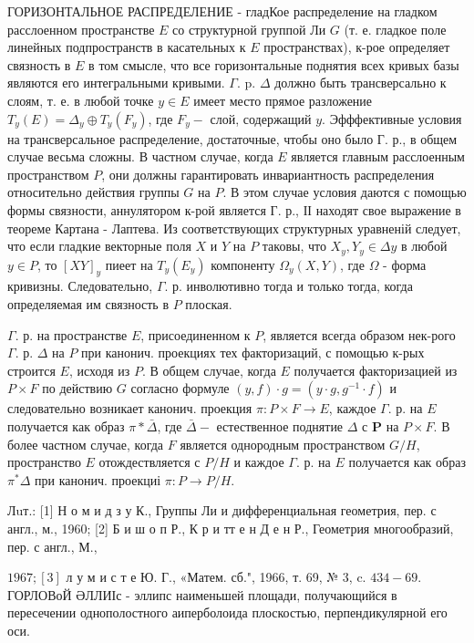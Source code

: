 \documentclass[10pt]{article}
\begin{document}
ГОРИЗОНТАЛЬНОЕ РАСПРЕДЕЛЕНИЕ - гладКое распределение на гладком расслоенном пространстве $E$ со структурной группой Ли $G$ (т. е. гладкое поле линейных подпространств в касательных к $E$ пространствах), к-рое определяет связность в $E$ в том смысле, что все горизонтальные поднятия всех кривых базы являются его интегральными кривыми. $\Gamma$. p. $\Delta$ должно быть трансверсально к слоям, т. е. в любой точке $y \in E$ имеет место прямое разложение $T_{y}(E)=\Delta_{y} \oplus T_{y}\left(F_{y}\right)$, где $F_{y}-$ слой, содержащий $y$. Эфффективные условия на трансверсальное распределение, достаточные, чтобы оно было Г. р., в общем случае весьма сложны. В частном случае, когда $E$ является главным расслоенным пространством $P$, они должны гарантировать инвариантность распределения относительно действия группы $G$ на $P$. В этом случае условия даются с помощью формы связности, аннулятором к-рой является $Г$. р., ІІ находят свое выражение в теореме Картана - Лаптева. Из соответствующих структурных уравненій следует, что если гладкие векторные поля $X$ и $Y$ на $P$ таковы, что $X_{y}, Y_{y} \in \Delta y$ в любой $y \in P$, то $[X Y]_{y}$ пиеет на $T_{y}\left(E_{y}\right)$ компоненту $\Omega_{y}(X, Y)$, где $\Omega$ - форма кривизны. Следовательно, $\Gamma$. р. инволютивно тогда и только тогда, когда определяемая им связность в $P$ плоская.



$\Gamma$. р. на пространстве $E$, присоединенном к $P$, является всегда образом нек-рого $\Gamma$. р. $\Delta$ на $P$ при канонич. проекциях тех факторизаций, с помощью к-рых строится $E$, исходя из $P$. В общем случае, когда $E$ получается факторизацией из $P \times F$ по действию $G$ согласно формуле $(y, f) \cdot g=\left(y \cdot g, g^{-1} \cdot f\right)$ и следовательно возникает канонич. проекция $\pi: P \times F \rightarrow E$, каждое $\Gamma$. р. на $E$ получается как образ $\pi * \bar{\Delta}$, где $\bar{\Delta}-$ естественное поднятие $\Delta$ с $\boldsymbol{P}$ на $P \times F$. В более частном случае, когда $F$ является однородным пространством $G / H$, пространство $E$ отождествляется с $P / H$ и каждое $\Gamma$. р. на $E$ получается как образ $\pi^{*} \Delta$ при канонич. проекциі $\pi: P \rightarrow P / H$.



Лuт.: [1] Н о м и д з у К., Группы Ли и дифференциальная геометрия, пер. с англ., м., 1960; [2] Б и ш о п Р., К р и тт е н Д е н Р., Геометрия многообразий, пер. с англ., М.,

$1967 ;[3]$ л у м и с т е Ю. Г., «Матем. сб.", 1966, т. 69, № 3, c. $434-69$. ГОРЛОВоЙ ӘЛЛИІс - эллипс наименьшей площади, получающийся в пересечении однополостного аиперболоида плоскостью, перпендикулярной его оси.
\end{document}
